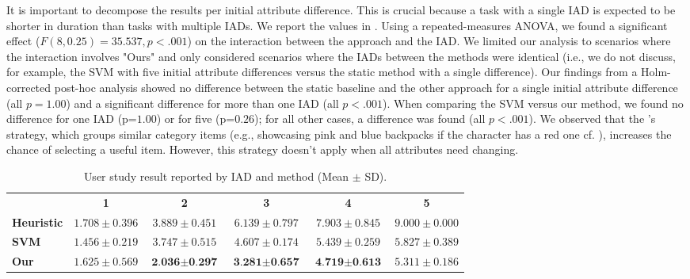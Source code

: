 It is important to decompose the results per initial attribute difference. This is crucial because a task with a single IAD is expected to be shorter in duration than tasks with multiple IADs. We report the values in . Using a repeated-measures ANOVA, we found a significant effect ($F(8, 0.25)=35.537, p<.001$) on the interaction between the approach and the IAD. We limited our analysis to scenarios where the interaction involves "Ours" and only considered scenarios where the IADs between the methods were identical (i.e., we do not discuss, for example, the SVM with five initial attribute differences versus the static method with a single difference). Our findings from a Holm-corrected post-hoc analysis showed no difference between the static baseline and the other approach for a single initial attribute difference (all $p=1.00$) and a significant difference for more than one IAD (all $p<.001$). When comparing the SVM versus our method, we found no difference for one IAD (p=$1.00$) or for five (p=$0.26$); for all other cases, a difference was found (all $p<.001$). We observed that the \interfaceagent's strategy, which groups similar category items (e.g., showcasing pink and blue backpacks if the character has a red one cf. ), increases the chance of selecting a useful item. However, this strategy doesn't apply when all attributes need changing.

\begin{table}[!t]
\centering
\caption{User study result reported by IAD and method (Mean $\pm$ SD).}
\label{tab:desc}
\begin{adjustbox}{width=\textwidth}
{
\begin{tabular}{lccccc}
\toprule
& \textbf{1} & \textbf{2} & \textbf{3} & \textbf{4} & \textbf{5} \\
\cmidrule[0.4pt]{2-6}
\textbf{Heuristic} & $1.708 \pm 0.396$ & $3.889 \pm 0.451$ & $6.139 \pm 0.797$ & $7.903 \pm 0.845$ & $9.000 \pm 0.000$ \\
\textbf{SVM} & $1.456 \pm 0.219$ & $3.747 \pm 0.515$ & $4.607 \pm 0.174$ & $5.439 \pm 0.259$ & $5.827 \pm 0.389$ \\
\textbf{Our} & $1.625 \pm 0.569$ & $\textbf{2.036} \pm \textbf{0.297}$ & $\textbf{3.281} \pm \textbf{0.657}$ & $\textbf{4.719} \pm \textbf{0.613}$ & $5.311 \pm 0.186$ \\
\bottomrule
\end{tabular}
}
\end{adjustbox}
\end{table}

